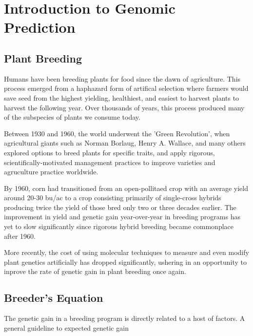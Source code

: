 \chapter{Introduction to Genomic Prediction}

\section{Plant Breeding}

Humans have been breeding plants for food since the dawn of agriculture. This process
emerged from a haphazard form of artifical selection where farmers would save seed from the 
highest yielding, healthiest, and easiest to harvest plants to harvest the following year. 
Over thousands of years, this process produced many of the subspecies of plants we consume today. 

Between 1930 and 1960, the world underwent the 'Green Revolution', when agricultural giants such
as Norman Borlaug, Henry A. Wallace, and many others explored options to breed plants for
specific traits, and apply rigorous, scientifically-motivated management practices to improve
varieties and agruculture practice worldwide.

By 1960, corn had transitioned from an open-pollitaed crop with an average yield around 20-30 bu/ac
to a crop consisting primarily of single-cross hybrids producing twice the yield of those bred 
only two or three decades earlier. The improvement in yield and genetic gain year-over-year in
breeding programs has yet to slow significantly since rigorous hybrid breeding became 
commonplace after 1960.

More recently, the cost of using molecular techniques to measure and even modify plant
genetics artificially has dropped significantly, ushering in an opportunity to inprove 
the rate of genetic gain in plant breeding once again.

\section{Breeder's Equation}

The genetic gain in a breeding program is directly related to a host of factors. A general guideline
to expected genetic gain 

